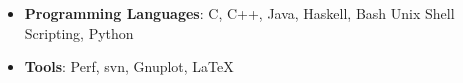 \begin{itemize}
  \item \textbf{Programming Languages}: C, C++, Java, Haskell, Bash Unix Shell Scripting, Python \\[-0.6cm]
  \item \textbf{Tools}: Perf, svn, Gnuplot, \LaTeX \\[-0.5cm]
\end{itemize}
